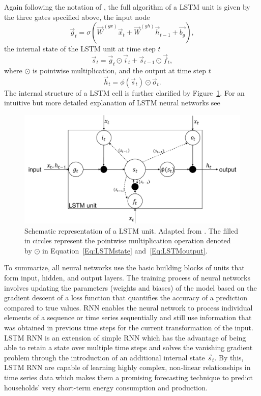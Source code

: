Again following the notation of \citet{Lipton:2015}, the full algorithm of a LSTM unit is given by the three gates specified above, the input node
%
\begin{equation} \label{Eq:LSTMinput}
    \vec{g}_t=\sigma\left(\vec{W}^{(gx)}\vec{x}_t+\vec{W}^{(gh)}\vec{h}_{t-1}+\vec{b_g}\right),
\end{equation}
%
the internal state of the LSTM unit at time step $t$
%
\begin{equation} \label{Eq:LSTMstate}
    \vec{s}_t=\vec{g}_t\odot\vec{i}_t+\vec{s}_{t-1}\odot\vec{f}_t,
\end{equation}
%
where $\odot$ is pointwise multiplication, and the output at time step $t$
%
\begin{equation} \label{Eq:LSTMoutput}
    \vec{h}_t=\phi\left(\vec{s}_t\right)\odot\vec{o}_t.
\end{equation}
%
The internal structure of a LSTM cell is further clarified by Figure~\ref{Fig:LSTMunit}. For an intuitive but more detailed explanation of LSTM neural networks see \citet[][Ch. 6.2]{chollet:2018}
%
\begin{figure}[htbp]
    \centering
    \includegraphics[scale=0.5]{thesis/figures/LSTMunit.pdf}
    \caption[Schematic representation of a LSTM unit]{Schematic representation of a LSTM unit. Adapted from \citet{Graves:2012}. The filled in circles represent the pointwise multiplication operation denoted by $\odot$ in Equation~\ref{Eq:LSTMstate} and~\ref{Eq:LSTMoutput}.}
    \label{Fig:LSTMunit}
\end{figure}

To summarize, all neural networks use the basic building blocks of units that form input, hidden, and output layers. The training process of neural networks involves updating the parameters (weights and biases) of the model based on the gradient descent of a loss function that quantifies the accuracy of a prediction compared to true values. RNN enables the neural network to process individual elements of a sequence or time series sequentially and still use information that was obtained in previous time steps for the current transformation of the input. LSTM RNN is an extension of simple RNN which has the advantage of being able to retain a state over multiple time steps and solves the vanishing gradient problem through the introduction of an additional internal state $\vec{s}_t$. By this, LSTM RNN are capable of learning highly complex, non-linear relationships in time series data which makes them a promising forecasting technique to predict households' very short-term energy consumption and production.



